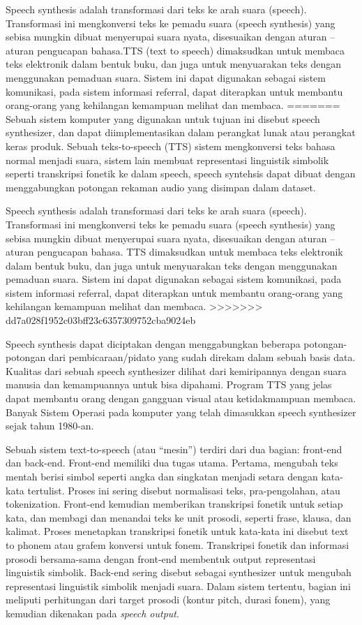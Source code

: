 Speech synthesis adalah transformasi dari teks ke arah suara (speech). Transformasi ini mengkonversi teks ke pemadu suara (speech synthesis) yang sebisa mungkin dibuat menyerupai suara nyata, disesuaikan dengan aturan – aturan pengucapan bahasa.TTS (text to speech) dimaksudkan untuk membaca teks elektronik dalam bentuk buku, dan juga untuk menyuarakan teks dengan menggunakan pemaduan suara. Sistem ini dapat digunakan sebagai sistem komunikasi, pada sistem informasi referral, dapat diterapkan untuk membantu orang-orang yang kehilangan kemampuan melihat dan membaca\cite{8639589}.
=======
Sebuah sistem komputer yang digunakan untuk tujuan ini disebut speech synthesizer, dan dapat diimplementasikan dalam perangkat lunak atau perangkat keras produk. Sebuah teks-to-speech (TTS) sistem mengkonversi teks bahasa normal menjadi suara, sistem lain membuat representasi linguistik simbolik seperti transkripsi fonetik ke dalam speech, speech syntehsis dapat dibuat dengan menggabungkan potongan rekaman audio yang disimpan dalam dataset.

Speech synthesis adalah transformasi dari teks ke arah suara (speech). Transformasi ini mengkonversi teks ke pemadu suara (speech synthesis) yang sebisa mungkin dibuat menyerupai suara nyata, disesuaikan dengan aturan – aturan pengucapan bahasa. TTS dimaksudkan untuk membaca teks elektronik dalam bentuk buku, dan juga untuk menyuarakan teks dengan menggunakan pemaduan suara. Sistem ini dapat digunakan sebagai sistem komunikasi, pada sistem informasi referral, dapat diterapkan untuk membantu orang-orang yang kehilangan kemampuan melihat dan membaca.
>>>>>>> dd7a028f1952c03bff23c6357309752cba9024eb

Speech synthesis dapat diciptakan dengan menggabungkan beberapa potongan-potongan dari pembicaraan/pidato yang sudah direkam dalam sebuah basis data. Kualitas dari sebuah speech synthesizer dilihat dari kemiripannya dengan suara manusia dan kemampuannya untuk bisa dipahami. Program TTS yang jelas dapat membantu orang dengan gangguan visual atau ketidakmampuan membaca. Banyak Sistem Operasi pada komputer yang telah dimasukkan speech synthesizer sejak tahun 1980-an.

Sebuah sistem text-to-speech (atau “mesin”) terdiri dari dua bagian: front-end dan back-end. Front-end memiliki dua tugas utama. Pertama, mengubah teks mentah berisi simbol seperti angka dan singkatan menjadi setara dengan kata-kata tertulist. Proses ini sering disebut normalisasi teks, pra-pengolahan, atau tokenization. Front-end kemudian memberikan transkripsi fonetik untuk setiap kata, dan membagi dan menandai teks ke unit prosodi, seperti frase, klausa, dan kalimat. Proses menetapkan transkripsi fonetik untuk kata-kata ini disebut text to phonem atau grafem konversi untuk fonem. Transkripsi fonetik dan informasi prosodi bersama-sama dengan front-end membentuk output representasi linguistik simbolik. Back-end sering disebut sebagai synthesizer untuk mengubah representasi linguistik simbolik menjadi suara. Dalam sistem tertentu, bagian ini meliputi perhitungan dari target prosodi (kontur pitch, durasi fonem), yang kemudian dikenakan pada \textit{speech output}.

